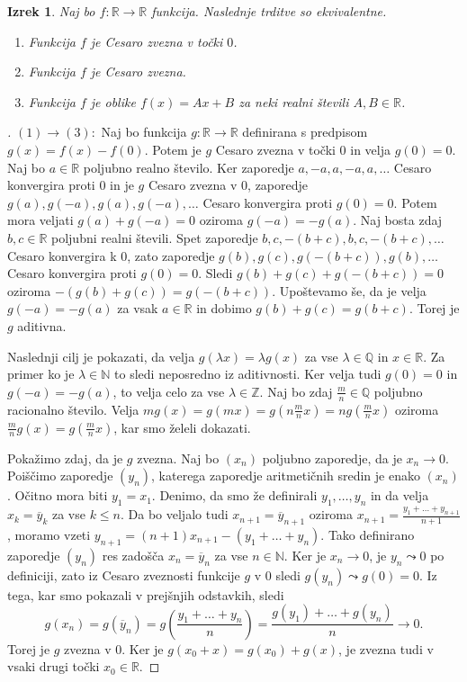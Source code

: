 \documentclass[a4paper,12pt]{article}
\theoremstyle{definition}
\theoremstyle{plain}
\newtheorem{izrek}{Izrek}
\newenvironment{dokaz}{\begin{proof}[\bfseries\upshape\proofname]}{\end{proof}}
\begin{document}
\begin{izrek}
    Naj bo $f: \mathbb{R} \rightarrow \mathbb{R}$ funkcija. Naslednje trditve so ekvivalentne.
    \begin{enumerate}
        \item Funkcija $f$ je Cesaro zvezna v točki $0$.
        \item Funkcija $f$ je Cesaro zvezna.
        \item Funkcija $f$ je oblike $f(x) = Ax + B$ za neki realni števili $A, B \in \mathbb{R}$.
    \end{enumerate}
\end{izrek}
\begin{dokaz}
    $(1) \rightarrow (3): $ Naj bo funkcija $g: \mathbb{R} \rightarrow \mathbb{R}$ definirana s predpisom $g(x) = f(x) - f(0)$. Potem je $g$ Cesaro zvezna v točki $0$ in velja $g(0) = 0$. 
    Naj bo $a \in \mathbb{R}$ poljubno realno število. Ker zaporedje $a, -a, a, -a, a, \ldots$ Cesaro konvergira proti $0$ in je $g$ Cesaro zvezna v $0$, zaporedje $g(a), g(-a), g(a), g(-a), \ldots$ Cesaro konvergira proti $g(0) = 0$. Potem mora veljati $g(a) + g(-a) = 0$ oziroma $g(-a) = -g(a)$. 
    Naj bosta zdaj $b, c \in \mathbb{R}$ poljubni realni števili. Spet zaporedje $b, c, -(b+c), b, c, -(b+c), \ldots$ Cesaro konvergira k $0$, zato zaporedje $g(b), g(c), g(-(b+c)), g(b), \ldots$ Cesaro konvergira proti $g(0) = 0$. Sledi $g(b) + g(c) + g(-(b+c)) = 0$ oziroma $-(g(b) + g(c)) = g(-(b+c))$. Upoštevamo še, da je velja $g(-a) = -g(a)$ za vsak $a \in \mathbb{R}$ in dobimo $g(b) + g(c) = g(b+c)$. Torej je $g$ aditivna.

    Naslednji cilj je pokazati, da velja $g(\lambda x) = \lambda g(x)$ za vse $\lambda \in \mathbb{Q}$ in $x \in \mathbb{R}$. Za primer ko je $\lambda \in \mathbb{N}$ to sledi neposredno iz aditivnosti. Ker velja tudi $g(0) = 0$ in $g(-a) = -g(a)$, to velja celo za vse $\lambda \in \mathbb{Z}$. Naj bo zdaj $\frac{m}{n} \in \mathbb{Q}$ poljubno racionalno število. Velja $mg(x) = g(mx) = g(n\frac{m}{n}x) = ng(\frac{m}{n}x)$ oziroma $\frac{m}{n}g(x) = g(\frac{m}{n}x)$, kar smo želeli dokazati.

    Pokažimo zdaj, da je $g$ zvezna. Naj bo $(x_n)$ poljubno zaporedje, da je $x_n \rightarrow 0$. Poiščimo zaporedje $(y_n)$, katerega zaporedje aritmetičnih sredin je enako $(x_n)$. Očitno mora biti $y_1 = x_1$. Denimo, da smo že definirali $y_1, \ldots, y_n$ in da velja $x_k = \overline{y}_k$ za vse $k \leq n$. Da bo veljalo tudi $x_{n+1} = \overline{y}_{n+1}$ oziroma $x_{n+1} = \frac{y_1 + \ldots + y_{n+1}}{n+1}$, moramo vzeti $y_{n+1} = (n+1)x_{n+1} - (y_1 + \ldots + y_n)$. Tako definirano zaporedje $(y_n)$ res zadošča $x_n = \overline{y}_n$ za vse $n \in \mathbb{N}$. Ker je $x_n \rightarrow 0$, je $y_n \leadsto 0$ po definiciji, zato iz Cesaro zveznosti funkcije $g$ v $0$ sledi $g(y_n) \leadsto g(0) = 0$. Iz tega, kar smo pokazali v prejšnjih odstavkih, sledi 
    $$g(x_n) = g(\overline{y}_n) = g(\frac{y_1 + \ldots + y_n}{n}) = \frac{g(y_1) + \ldots + g(y_n)}{n} \rightarrow 0.$$
    Torej je $g$ zvezna v $0$. Ker je $g(x_0 + x) = g(x_0) + g(x)$, je zvezna tudi v vsaki drugi točki $x_0 \in \mathbb{R}$.


\end{dokaz}
\end{document}
